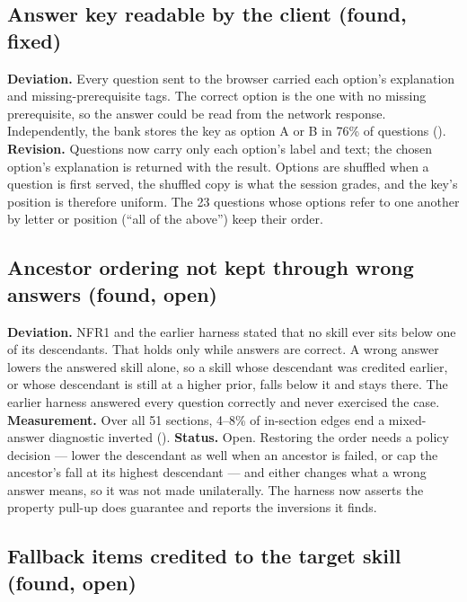 \subsection{Answer key readable by the client (found, fixed)}
\label{sec:revisions-key}

\textbf{Deviation.} Every question sent to the browser carried each option's
explanation and missing-prerequisite tags. The correct option is the one with no
missing prerequisite, so the answer could be read from the network response.
Independently, the bank stores the key as option A or B in 76\% of questions
(). \textbf{Revision.} Questions now carry only each
option's label and text; the chosen option's explanation is returned with the
result. Options are shuffled when a question is first served, the shuffled copy
is what the session grades, and the key's position is therefore uniform. The 23
questions whose options refer to one another by letter or position (``all of the
above'') keep their order.



\subsection{Ancestor ordering not kept through wrong answers (found, open)}
\label{sec:revisions-ordering}

\textbf{Deviation.} NFR1 and the earlier harness stated that no skill ever sits
below one of its descendants. That holds only while answers are correct. A wrong
answer lowers the answered skill alone, so a skill whose descendant was credited
earlier, or whose descendant is still at a higher prior, falls below it and stays
there. The earlier harness answered every question correctly and never exercised
the case. \textbf{Measurement.} Over all 51 sections, 4--8\% of in-section edges
end a mixed-answer diagnostic inverted ().
\textbf{Status.} Open. Restoring the order needs a policy decision --- lower the
descendant as well when an ancestor is failed, or cap the ancestor's fall at its
highest descendant --- and either changes what a wrong answer means, so it was not
made unilaterally. The harness now asserts the property pull-up does guarantee
and reports the inversions it finds.



\subsection{Fallback items credited to the target skill (found, open)}
\label{sec:revisions-attribution}

